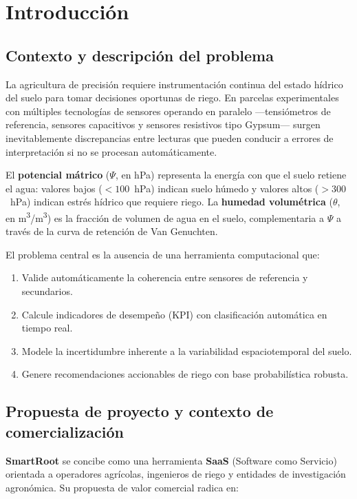 \documentclass[12pt,a4paper]{article}
\begin{document}
\section{Introducción}

\subsection{Contexto y descripción del problema}

La agricultura de precisión requiere instrumentación continua del estado hídrico del suelo para tomar decisiones oportunas de riego. En parcelas experimentales con múltiples tecnologías de sensores operando en paralelo ---tensiómetros de referencia, sensores capacitivos y sensores resistivos tipo Gypsum--- surgen inevitablemente discrepancias entre lecturas que pueden conducir a errores de interpretación si no se procesan automáticamente.

El \textbf{potencial mátrico} ($\Psi$, en hPa) representa la energía con que el suelo retiene el agua: valores bajos ($<100$~hPa) indican suelo húmedo y valores altos ($>300$~hPa) indican estrés hídrico que requiere riego. La \textbf{humedad volumétrica} ($\theta$, en m\textsuperscript{3}/m\textsuperscript{3}) es la fracción de volumen de agua en el suelo, complementaria a $\Psi$ a través de la curva de retención de Van Genuchten.

El problema central es la ausencia de una herramienta computacional que:
\begin{enumerate}[noitemsep]
    \item Valide automáticamente la coherencia entre sensores de referencia y secundarios.
    \item Calcule indicadores de desempeño (KPI) con clasificación automática en tiempo real.
    \item Modele la incertidumbre inherente a la variabilidad espaciotemporal del suelo.
    \item Genere recomendaciones accionables de riego con base probabilística robusta.
\end{enumerate}

\subsection{Propuesta de proyecto y contexto de comercialización}

\textbf{SmartRoot} se concibe como una herramienta \textbf{SaaS} (Software como Servicio) orientada a operadores agrícolas, ingenieros de riego y entidades de investigación agronómica. Su propuesta de valor comercial radica en:
\end{document}
